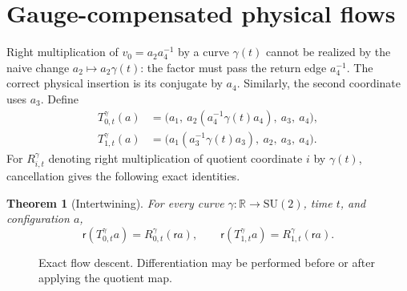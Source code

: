 \documentclass[11pt]{article}
\newtheorem{theorem}{Theorem}[section]
\theoremstyle{definition}
\newcommand{\SU}{\mathrm{SU}(2)}
\newcommand{\red}{\mathsf r}
\begin{document}
\section{Gauge-compensated physical flows}

Right multiplication of $v_0=a_2a_4^{-1}$ by a curve $\gamma(t)$ cannot be
realized by the naive change $a_2\mapsto a_2\gamma(t)$: the factor must pass
the return edge $a_4^{-1}$.  The correct physical insertion is its conjugate
by $a_4$.  Similarly, the second coordinate uses $a_3$.  Define
\begin{align}
 T_{0,t}^{\gamma}(a)
   &=\bigl(a_1,\ a_2(a_4^{-1}\gamma(t)a_4),\ a_3,\ a_4\bigr),
   \label{eq:flow0}\\
 T_{1,t}^{\gamma}(a)
   &=\bigl(a_1(a_3^{-1}\gamma(t)a_3),\ a_2,\ a_3,\ a_4\bigr).
   \label{eq:flow1}
\end{align}
For $R_{i,t}^{\gamma}$ denoting right multiplication of quotient coordinate
$i$ by $\gamma(t)$, cancellation gives the following exact identities.

\begin{theorem}[Intertwining]\label{thm:intertwine}
For every curve $\gamma:\mathbb R\to\SU$, time $t$, and configuration $a$,
\begin{equation}\label{eq:intertwine}
 \red(T_{0,t}^{\gamma}a)=R_{0,t}^{\gamma}(\red a),\qquad
 \red(T_{1,t}^{\gamma}a)=R_{1,t}^{\gamma}(\red a).
\end{equation}
\end{theorem}

\begin{figure}[ht]
\centering
{}
\caption{Exact flow descent.  Differentiation may be performed before or
after applying the quotient map.}
\label{fig:square}
\end{figure}
\end{document}
